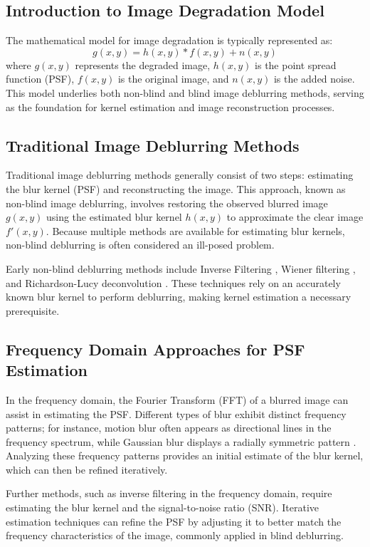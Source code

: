 \documentclass[twoside,11pt]{article}
\begin{document}
\subsection{Introduction to Image Degradation Model}
The mathematical model for image degradation is typically represented as:
\[
g(x, y) = h(x, y) * f(x, y) + n(x, y)
\]
where \( g(x, y) \) represents the degraded image, \( h(x, y) \) is the point spread function (PSF), \( f(x, y) \) is the original image, and \( n(x, y) \) is the added noise. This model underlies both non-blind and blind image deblurring methods, serving as the foundation for kernel estimation and image reconstruction processes.

\subsection{Traditional Image Deblurring Methods}
Traditional image deblurring methods generally consist of two steps: estimating the blur kernel (PSF) and reconstructing the image. This approach, known as non-blind image deblurring, involves restoring the observed blurred image \( g(x, y) \) using the estimated blur kernel \( h(x, y) \) to approximate the clear image \( f'(x, y) \). Because multiple methods are available for estimating blur kernels, non-blind deblurring is often considered an ill-posed problem.

Early non-blind deblurring methods include Inverse Filtering \citep{saberi1999inverse}, Wiener filtering \citep{wiener1949extrapolation}, and Richardson-Lucy deconvolution \citep{richardson1972bayesian}. These techniques rely on an accurately known blur kernel to perform deblurring, making kernel estimation a necessary prerequisite.

\subsection{Frequency Domain Approaches for PSF Estimation}
In the frequency domain, the Fourier Transform (FFT) of a blurred image can assist in estimating the PSF. Different types of blur exhibit distinct frequency patterns; for instance, motion blur often appears as directional lines in the frequency spectrum, while Gaussian blur displays a radially symmetric pattern \citep{john2020fourier}. Analyzing these frequency patterns provides an initial estimate of the blur kernel, which can then be refined iteratively.

Further methods, such as inverse filtering in the frequency domain, require estimating the blur kernel and the signal-to-noise ratio (SNR). Iterative estimation techniques can refine the PSF by adjusting it to better match the frequency characteristics of the image, commonly applied in blind deblurring.
\end{document}
